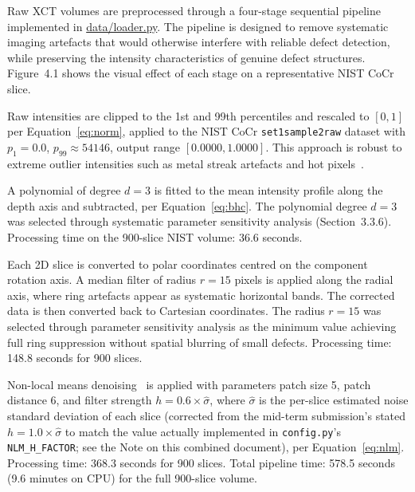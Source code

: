 Raw XCT volumes are preprocessed through a four-stage sequential pipeline implemented in
\url{data/loader.py}. The pipeline is designed to remove systematic imaging artefacts that would
otherwise interfere with reliable defect detection, while preserving the intensity characteristics of
genuine defect structures. Figure~4.1 shows the visual effect of each stage on a representative NIST
CoCr slice.

Raw intensities are clipped to the 1st and 99th percentiles and rescaled to $[0, 1]$ per
Equation~\eqref{eq:norm}, applied to the NIST CoCr \texttt{set1sample2raw} dataset with $p_1 = 0.0$,
$p_{99} \approx 54146$, output range $[0.0000, 1.0000]$. This approach is robust to extreme outlier
intensities such as metal streak artefacts and hot pixels~\citep{Bellens2021}.

A polynomial of degree $d = 3$ is fitted to the mean intensity profile along the depth axis and
subtracted, per Equation~\eqref{eq:bhc}. The polynomial degree $d = 3$ was selected through
systematic parameter sensitivity analysis (Section~3.3.6). Processing time on the 900-slice NIST
volume: 36.6 seconds.

Each 2D slice is converted to polar coordinates centred on the component rotation axis. A median
filter of radius $r = 15$ pixels is applied along the radial axis, where ring artefacts appear as
systematic horizontal bands. The corrected data is then converted back to Cartesian coordinates. The
radius $r = 15$ was selected through parameter sensitivity analysis as the minimum value achieving
full ring suppression without spatial blurring of small defects. Processing time: 148.8 seconds for
900 slices.

Non-local means denoising~\citep{Buades2005} is applied with parameters patch size 5, patch distance
6, and filter strength $h = 0.6 \times \hat{\sigma}$, where $\hat{\sigma}$ is the per-slice estimated
noise standard deviation of each slice (corrected from the mid-term submission's stated
$h = 1.0 \times \hat{\sigma}$ to match the value actually implemented in \texttt{config.py}'s
\texttt{NLM\_H\_FACTOR}; see the Note on this combined document), per Equation~\eqref{eq:nlm}.
Processing time: 368.3 seconds for 900 slices. Total pipeline time: 578.5 seconds (9.6 minutes on
CPU) for the full 900-slice volume.


